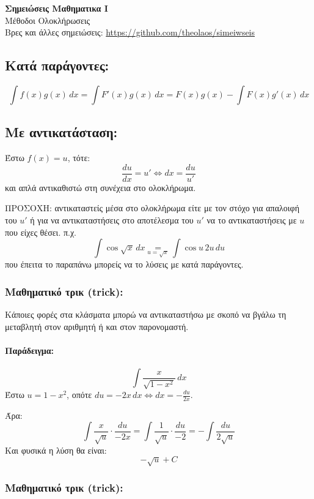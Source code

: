 \documentclass[a4paper,12pt]{article}
\begin{document}
\begin{center}
    \LARGE \textbf{Σημειώσεις Μαθηματικα Ι}\\[1ex]
    \large Μέθοδοι Ολοκλήρωσεις \\
    \normalsize Βρες και άλλες σημειώσεις: \url{https://github.com/theolaos/simeiwseis}
\end{center}

\subsection*{Κατά παράγοντες:}
\[
\int f(x)g(x)\,dx = \int F'(x)g(x)\,dx = F(x)g(x) - \int F(x)g'(x)\,dx
\]

\subsection*{Με αντικατάσταση:}
Έστω $f(x) = u$, τότε:
\[
\frac{du}{dx} = u' \iff dx = \frac{du}{u'}
\]
και απλά αντικαθιστώ στη συνέχεια στο ολοκλήρωμα.

ΠΡΟΣΟΧΗ: αντικαταστείς μέσα στο ολοκλήρωμα είτε με τον στόχο για απαλοιφή του $u'$ ή για να αντικαταστήσεις 
στο αποτέλεσμα του $u'$ να το αντικαταστήσεις με $u$ που είχες θέσει. π.χ. 
\[
\int \cos\sqrt{x}\,dx \underset{u = \sqrt{x}}{=} \int \cos{u}\,2u\,du 
\]
που έπειτα το παραπάνω μπορείς να το λύσεις με κατά παράγοντες.

\subsubsection*{Μαθηματικό τρικ (trick):}

Κάποιες φορές στα κλάσματα μπορώ να αντικαταστήσω με σκοπό να βγάλω τη μεταβλητή στον αριθμητή ή και στον παρονομαστή.

\paragraph{Παράδειγμα:}
\[
\int \frac{x}{\sqrt{1-x^2}}\,dx
\]
Έστω $u = 1-x^2$, οπότε $du = -2x\,dx \iff dx = -\frac{du}{2x}$.

Άρα:
\[
\int \frac{x}{\sqrt{u}} \cdot \frac{du}{-2x} = \int \frac{1}{\sqrt{u}} \cdot \frac{du}{-2} = -\int \frac{du}{2\sqrt{u}}
\]
Και φυσικά η λύση θα είναι:
\[
-\sqrt{u} + C
\]

\subsubsection*{Μαθηματικό τρικ (trick):}
\end{document}
